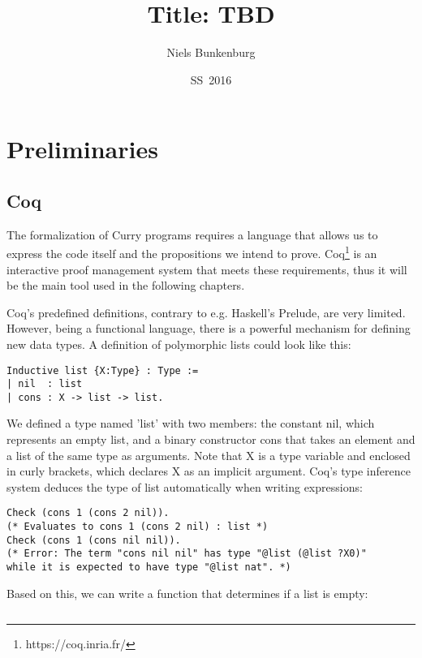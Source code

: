 \documentclass{scrreprt}
\newcommand{\todo}[1]{\marginpar{\textbf{TODO:} #1}}
\begin{document}

\titlehead{\large Christian-Albrechts-Universität zu Kiel}
\subject{Bachelor Thesis}
\title{Title: TBD}
\date{SS~2016}
\author{Niels Bunkenburg}
\maketitle



\renewcommand{\contentsname}{Contents}
\tableofcontents   %

\newpage               %


%   
%   


\chapter{Preliminaries}
\section{Coq}
The formalization of Curry programs requires a language that allows us to express the code itself and the propositions we intend to prove. Coq\footnote{https://coq.inria.fr/} is an interactive proof management system that meets these requirements, thus it will be the main tool used in the following chapters.
\todo{Kommasetzung?}
\par
Coq's predefined definitions, contrary to e.g. Haskell's Prelude, are very limited. However, being a functional language, there is a powerful mechanism for defining new data types. A definition of polymorphic lists could look like this:
\begin{verbatim}
Inductive list {X:Type} : Type :=
| nil  : list
| cons : X -> list -> list.
\end{verbatim}
We defined a type named 'list' with two members: the constant nil, which represents an empty list, and a binary constructor cons that takes an element and a list of the same type as arguments. Note that X is a type variable and enclosed in curly brackets, which declares X as an implicit argument. Coq's type inference system deduces the type of list automatically when writing expressions:
\begin{verbatim}
Check (cons 1 (cons 2 nil)).
(* Evaluates to cons 1 (cons 2 nil) : list *)
Check (cons 1 (cons nil nil)). 
(* Error: The term "cons nil nil" has type "@list (@list ?X0)"
while it is expected to have type "@list nat". *)
\end{verbatim}
Based on this, we can write a function that determines if a list is empty:
\begin{verbatim}

\end{verbatim}
\end{document}

